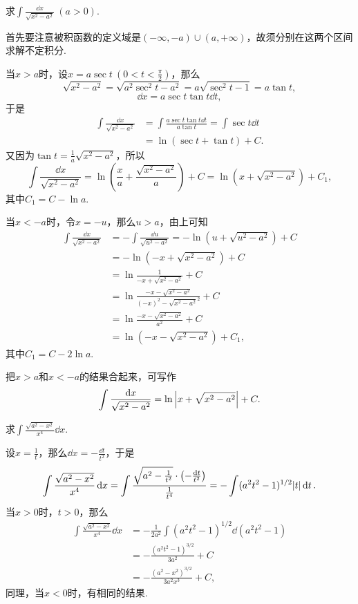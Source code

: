 \begin{example}
求\(\int \frac{\dd{x}}{\sqrt{x^2 - a^2}}\ (a>0)\).
\begin{solution}
首先要注意被积函数的定义域是\((-\infty,-a)\cup(a,+\infty)\)，故须分别在这两个区间求解不定积分.

当\(x > a\)时，设\(x = a \sec t\ (0 < t < \frac{\pi}{2})\)，那么\[
\sqrt{x^2 - a^2} = \sqrt{a^2 \sec^2 t - a^2} = a \sqrt{\sec^2 t - 1} = a \tan t,
\]\[
\dd{x} = a \sec t \tan t \dd{t},
\]于是\begin{align*}
\int \frac{\dd{x}}{\sqrt{x^2 - a^2}}
&= \int \frac{a \sec t \tan t \dd{t}}{a \tan t}
= \int \sec t \dd{t} \\
&= \ln(\sec t + \tan t) + C.
\end{align*}又因为\(\tan t = \frac{1}{a} \sqrt{x^2 - a^2}\)，所以\[
\int \frac{\dd{x}}{\sqrt{x^2 - a^2}}
= \ln( \frac{x}{a} + \frac{\sqrt{x^2 - a^2}}{a} ) + C
= \ln( x + \sqrt{x^2 - a^2} ) + C_1,
\]其中\(C_1 = C - \ln a\).

当\(x < -a\)时，令\(x = -u\)，那么\(u > a\)，由上可知\begin{align*}
\int \frac{\dd{x}}{\sqrt{x^2 - a^2}}
&= -\int \frac{\dd{u}}{\sqrt{u^2 - a^2}}
= -\ln(u + \sqrt{u^2 - a^2}) + C \\
&= -\ln(-x + \sqrt{x^2 - a^2}) + C \\
&= \ln\frac{1}{-x + \sqrt{x^2 - a^2}} + C \\
&= \ln\frac{-x - \sqrt{x^2 - a^2}}{(-x)^2 - \sqrt{x^2 - a^2}^2} + C \\
&= \ln\frac{-x - \sqrt{x^2 - a^2}}{a^2} + C \\
&= \ln(-x - \sqrt{x^2 - a^2}) + C_1,
\end{align*}其中\(C_1 = C - 2 \ln a\).

把\(x > a\)和\(x < -a\)的结果合起来，可写作\[
\int \frac{\dd{x}}{\sqrt{x^2 - a^2}}
= \ln\abs{x + \sqrt{x^2 - a^2}} + C.
\]
\end{solution}
\end{example}

\begin{example}
求\(\int \frac{\sqrt{a^2 - x^2}}{x^4} \dd{x}\).
\begin{solution}
设\(x = \frac{1}{t}\)，那么\(\dd{x} = -\frac{\dd{t}}{t^2}\)，于是\[
\int \frac{\sqrt{a^2 - x^2}}{x^4} \dd{x}
= \int \frac{\sqrt{a^2 - \frac{1}{t^2}} \cdot \left( -\frac{\dd{t}}{t^2} \right)}{\frac{1}{t^4}}
= -\int (a^2 t^2 - 1)^{1/2} \abs{t} \dd{t}.
\]当\(x > 0\)时，\(t > 0\)，那么\begin{align*}
\int \frac{\sqrt{a^2 - x^2}}{x^4} \dd{x}
&= -\frac{1}{2a^2} \int (a^2 t^2 - 1)^{1/2} \dd(a^2 t^2 - 1) \\
&= -\frac{(a^2 t^2 - 1)^{3/2}}{3 a^2} + C \\
&= -\frac{(a^2 - x^2)^{3/2}}{3 a^2 x^3} + C,
\end{align*}
同理，当\(x < 0\)时，有相同的结果.
\end{solution}
\end{example}

